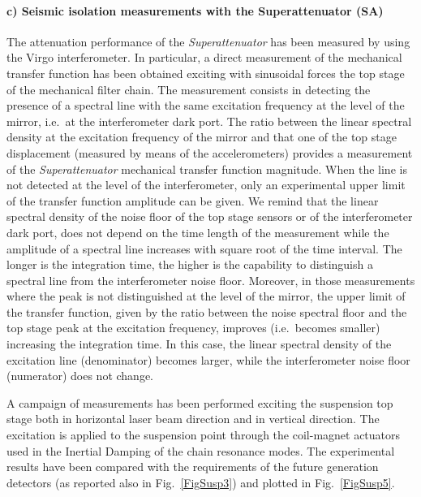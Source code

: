 \paragraph{c) Seismic isolation measurements with the Superattenuator (SA)}

The attenuation performance of the \emph{Superattenuator} has been measured by using the Virgo interferometer. In particular, a direct measurement of the mechanical transfer function has been obtained exciting with sinusoidal forces the top stage of  the mechanical filter chain. The measurement consists in detecting the presence of a spectral line with the same excitation frequency at the level of the mirror, i.e.\ at the interferometer dark port. The ratio between the linear spectral density at the excitation frequency of the mirror and that one of the top stage displacement (measured by means of the accelerometers) provides a measurement of the \emph{Superattenuator} mechanical transfer function magnitude. When the line is not detected at the level of the interferometer, only an experimental upper limit of the transfer function amplitude can be given. We remind that the linear spectral density of the noise floor of the top stage sensors or of the interferometer dark port, does not depend on the time length of the measurement while the amplitude of a spectral line increases with square root of the time interval. The longer is the integration time, the higher is the capability to distinguish a spectral line from the interferometer noise floor. Moreover, in those measurements where the peak is not distinguished at the level of the mirror, the upper limit of the transfer function, given by the ratio between the noise spectral floor and the top stage peak at the excitation frequency, improves (i.e.\ becomes smaller) increasing the integration time. In this case, the linear spectral density of the excitation line (denominator) becomes larger, while the interferometer noise floor (numerator) does not change.

A campaign of measurements has been performed exciting the suspension top stage both in horizontal laser beam direction and in vertical direction. The excitation is applied to the suspension point through the coil-magnet actuators used in the Inertial Damping of the chain resonance modes. The experimental results have been compared with the requirements of the future generation detectors (as reported also in Fig.~\ref{FigSusp3}) and plotted in Fig.~\ref{FigSusp5}.

